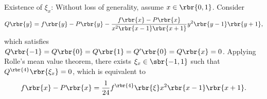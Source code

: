\documentclass[english, nochinese]{../textmpls/pkupaper}
\begin{document}
\begin{thmquestion}
\begin{thmproof}
Existence of $\xi_x$: Without loss of generality, assume $ x \in \rbr{ 0, 1 } $. Consider
\begin{equation}
Q \rbr{y} = f \rbr{y} - P \rbr{y} - \frac{ f \rbr{x} - P \rbr{x} }{ x^2 \rbr{ x - 1 } \rbr{ x + 1 } } y^2 \rbr{ y - 1 } \rbr{ y + 1 },
\end{equation}
which satisfies $ Q \rbr{-1} = Q \rbr{0} = Q \rbr{1} = Q' \rbr{0} = Q \rbr{x} = 0 $. Applying Rolle's mean value theorem, there exists $ \xi_x \in \sbr{ -1, 1 } $ such that $ Q^{\rbr{4}} \rbr{\xi_x} = 0 $, which is equivalent to
\begin{equation}
f \rbr{x} - P \rbr{x} = \frac{1}{24} f^{\rbr{4}} \rbr{\xi} x^2 \rbr{ x - 1 } \rbr{ x + 1 }.
\end{equation}

\sqed
\end{thmproof}
\end{thmquestion}
\end{document}
